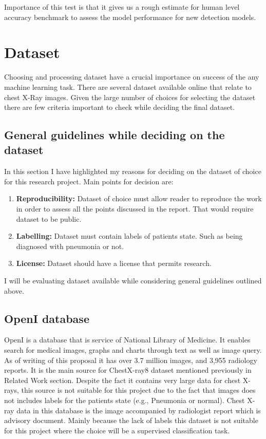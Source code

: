 \documentclass[12pt, twoside, a4paper]{article}
\begin{document}
Importance of this test is that it gives us a rough estimate for human level accuracy benchmark to assess the model performance for new detection models.


\clearpage
\section{Dataset}
Choosing and processing dataset have a crucial importance on success of the any machine learning task. There are several dataset available online that relate to chest X-Ray images. Given the large number of choices for selecting the dataset there are few criteria important to check while deciding the final dataset.

\subsection{General guidelines while deciding on the dataset}
In this section I have highlighted my reasons for deciding on the dataset of choice for this research project. Main points for decision are:
\begin{enumerate}
    \item \textbf{Reproducibility: }Dataset of choice must allow reader to reproduce the work in order to assess all the points discussed in the report. That would require dataset to be public.
    \item \textbf{Labelling: }Dataset must contain labels of patients state. Such as being diagnosed with pneumonia or not.
    \item \textbf{License: }Dataset should have a license that permits research.
\end{enumerate}
I will be evaluating dataset available while considering general guidelines outlined above.

\subsection{OpenI database}

OpenI\cite{openi} is a database that is service of National Library of Medicine. It enables search for medical images, graphs and charts through text as well as image query. As of writing of this proposal it has over 3.7 million images, and 3,955 radiology reports. It is the main source for ChestX-ray8 dataset mentioned previously in Related Work section. Despite the fact it contains very large data for chest X-rays, this source is not suitable for this project due to the fact that images does not includes labels for the patients state (e.g., Pneumonia or normal). Chest X-ray data in this database is the image accompanied by radiologist report which is advisory document. Mainly because the lack of labels this dataset is not suitable for this project where the choice will be a supervised classification task.
\end{document}
